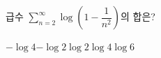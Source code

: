 급수 $\displaystyle\sum_{n=2}^{\infty}\log\left(1-\dfrac{1}{n^2}\right)$의 합은?
\begin{choices32}{$-\log 4$}{$-\log 2$}{$\log 2$}{$\log 4$}{$\log 6$}\end{choices32}
